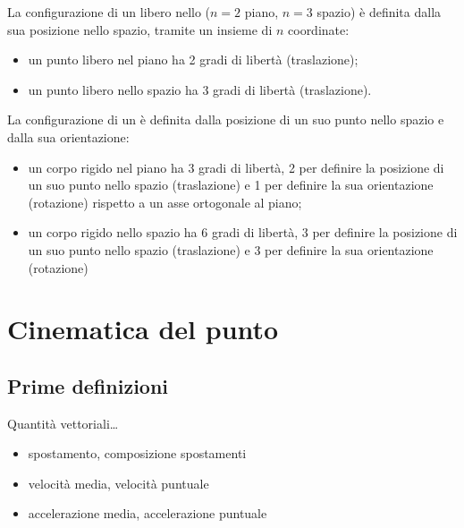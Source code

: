 \documentclass[letterpaper,10pt,italian]{jupyterBook}
\begin{document}
\sphinxAtStartPar
La configurazione di un  libero nello  (\(n=2\) piano, \(n=3\) spazio) è definita dalla sua posizione nello spazio, tramite un insieme di \(n\) coordinate:
\begin{itemize}
\item {} 
\sphinxAtStartPar
un punto libero nel piano ha 2 gradi di libertà (traslazione);

\item {} 
\sphinxAtStartPar
un punto libero nello spazio ha 3 gradi di libertà (traslazione).

\end{itemize}

\sphinxAtStartPar
La configurazione di un  è definita dalla posizione di un suo punto nello spazio e dalla sua orientazione:
\begin{itemize}
\item {} 
\sphinxAtStartPar
un corpo rigido nel piano ha 3 gradi di libertà, 2 per definire la posizione di un suo punto nello spazio (traslazione) e 1 per definire la sua orientazione (rotazione) rispetto a un asse ortogonale al piano;

\item {} 
\sphinxAtStartPar
un corpo rigido nello spazio ha 6 gradi di libertà, 3 per definire la posizione di un suo punto nello spazio (traslazione) e 3 per definire la sua orientazione (rotazione)

\end{itemize}

\sphinxstepscope




\section{Cinematica del punto}
\label{\detokenize{ch/mechanics/kinematics-point:cinematica-del-punto}}\label{\detokenize{ch/mechanics/kinematics-point:physics-hs-mechanics-kinematics-point}}\label{\detokenize{ch/mechanics/kinematics-point::doc}}

\subsection{Prime definizioni}
\label{\detokenize{ch/mechanics/kinematics-point:prime-definizioni}}
\sphinxAtStartPar
Quantità vettoriali…
\begin{itemize}
\item {} 
\sphinxAtStartPar
spostamento, composizione spostamenti

\item {} 
\sphinxAtStartPar
velocità media, velocità puntuale

\item {} 
\sphinxAtStartPar
accelerazione media, accelerazione puntuale

\end{itemize}
\end{document}

